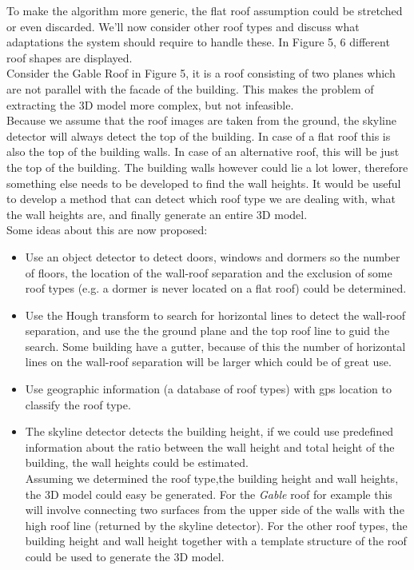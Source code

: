 \documentclass[10pt]{article}
\begin{document}
{%
To make the algorithm more generic, the flat roof assumption could be stretched or even discarded.
We'll now consider other roof types and discuss what adaptations the system should require to handle these.
In Figure 5, 6 different roof shapes are displayed.\\
Consider the Gable Roof in Figure 5, it is a roof consisting of two planes
which are not parallel with the facade of the building. This makes the problem
of extracting the 3D model more complex, but not  infeasible. \\
Because we assume that the roof images are taken from the ground, the skyline
detector will always detect the top of the building. In case of a flat roof
this is also the top of the building walls.  In case of an
alternative roof, this will be just the top of the building. The building walls however
could lie a lot lower, therefore something else needs to be developed to find the wall
heights. It would be useful to develop a method that can detect which roof type we
are dealing with, what the wall heights are, and finally generate an entire 3D
model.\\
Some ideas about this are now proposed:\\
\begin{itemize}
	\item Use an object detector to detect doors, windows and dormers so the 
	number of floors, the location of the wall-roof separation and the exclusion of
	some roof types (e.g. a dormer is never located on a flat roof) could be determined.\\
	\item Use the Hough transform to search for horizontal lines to detect the
	wall-roof separation, and use the the ground plane and the top roof line to
	guid the search.  Some building have a gutter, because of this the number
	of horizontal lines on the wall-roof separation will be larger which could
	be of great use.\\
	\item Use geographic information (a database of roof types) with gps location
	to classify the roof type. \\
	\item The skyline detector detects the building height, if we
	could use predefined information about the ratio between the wall height and
	total height of the building, the wall heights could be estimated.\\
Assuming we determined the roof type,the building height and wall heights, the 3D model could 
easy be generated. For the \emph{Gable} roof for example this will involve
connecting two surfaces from the upper side of the walls with the high roof line (returned by the
skyline detector). For the other roof types, the building height and wall
height together with a template structure of the roof could be used to generate the 3D
model.


\end{itemize}}
\end{document}
